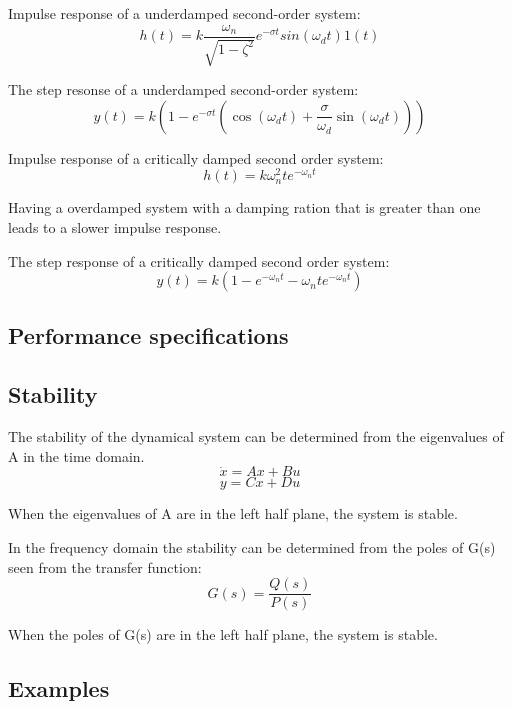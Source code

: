 \newpage
Impulse response of a underdamped second-order system:
$$h(t) = k \frac{\omega_n}{\sqrt{1-\zeta ^2}} e^{-\sigma t} sin(\omega_d t) 1(t) $$

The step resonse of a underdamped second-order system:
$$y(t) = k(1-e^{-\sigma t}(\cos(\omega_d t)+\frac{\sigma}{\omega_d}\sin(\omega_d t)))$$

Impulse response of a critically damped second order system:
$$h(t) = k\omega_n^2te^{-\omega_n t}$$

Having a overdamped system with a damping ration that is greater than one leads to a slower impulse response.

The step response of a critically damped second order system:
$$y(t) = k(1-e^{-\omega_nt}-\omega_n te^{-\omega_nt})$$

\subsection{Performance specifications}




\subsection{Stability}
The stability of the dynamical system can be determined from the eigenvalues of A in the time domain.
$$\dot{x} = Ax+Bu$$
$$y=Cx+Du$$

When the eigenvalues of A are in the left half plane, the system is stable.


In the frequency domain the stability can be determined from the poles of G(s) seen from the transfer function:
$$G(s) = \frac{Q(s)}{P(s)}$$

When the poles of G(s) are in the left half plane, the system is stable.



\subsection{Examples}
